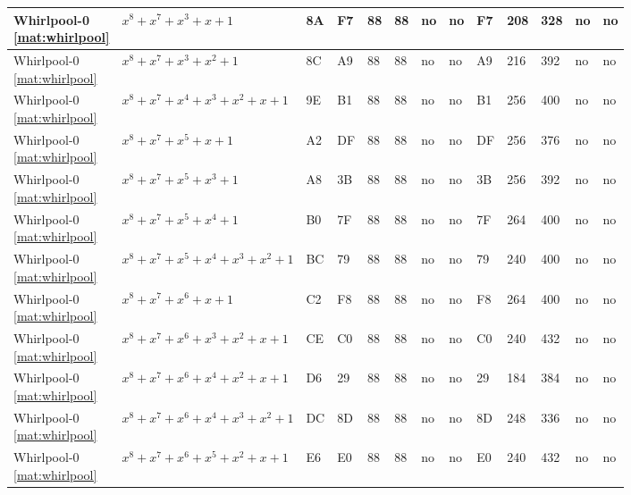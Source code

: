 \begin{tiny}
\begin{longtable}{|l|l|l|l|l|l|l|l|l|l|l|l|l|}
\shortstack{Whirlpool-0 \\ \eqref{mat:whirlpool}} & $x^8 + x^7 + x^3 + x + 1$ & 8A & F7 & 88 & 88 & no & no & F7 & 208 & 328 & no & no \\ \hline
\shortstack{Whirlpool-0 \\ \eqref{mat:whirlpool}} & $x^8 + x^7 + x^3 + x^2 + 1$ & 8C & A9 & 88 & 88 & no & no & A9 & 216 & 392 & no & no \\ \hline
\shortstack{Whirlpool-0 \\ \eqref{mat:whirlpool}} & $x^8 + x^7 + x^4 + x^3 + x^2 + x + 1$ & 9E & B1 & 88 & 88 & no & no & B1 & 256 & 400 & no & no \\ \hline
\shortstack{Whirlpool-0 \\ \eqref{mat:whirlpool}} & $x^8 + x^7 + x^5 + x + 1$ & A2 & DF & 88 & 88 & no & no & DF & 256 & 376 & no & no \\ \hline
\shortstack{Whirlpool-0 \\ \eqref{mat:whirlpool}} & $x^8 + x^7 + x^5 + x^3 + 1$ & A8 & 3B & 88 & 88 & no & no & 3B & 256 & 392 & no & no \\ \hline
\shortstack{Whirlpool-0 \\ \eqref{mat:whirlpool}} & $x^8 + x^7 + x^5 + x^4 + 1$ & B0 & 7F & 88 & 88 & no & no & 7F & 264 & 400 & no & no \\ \hline
\shortstack{Whirlpool-0 \\ \eqref{mat:whirlpool}} & $x^8 + x^7 + x^5 + x^4 + x^3 + x^2 + 1$ & BC & 79 & 88 & 88 & no & no & 79 & 240 & 400 & no & no \\ \hline
\shortstack{Whirlpool-0 \\ \eqref{mat:whirlpool}} & $x^8 + x^7 + x^6 + x + 1$ & C2 & F8 & 88 & 88 & no & no & F8 & 264 & 400 & no & no \\ \hline
\shortstack{Whirlpool-0 \\ \eqref{mat:whirlpool}} & $x^8 + x^7 + x^6 + x^3 + x^2 + x + 1$ & CE & C0 & 88 & 88 & no & no & C0 & 240 & 432 & no & no \\ \hline
\shortstack{Whirlpool-0 \\ \eqref{mat:whirlpool}} & $x^8 + x^7 + x^6 + x^4 + x^2 + x + 1$ & D6 & 29 & 88 & 88 & no & no & 29 & 184 & 384 & no & no \\ \hline
\shortstack{Whirlpool-0 \\ \eqref{mat:whirlpool}} & $x^8 + x^7 + x^6 + x^4 + x^3 + x^2 + 1$ & DC & 8D & 88 & 88 & no & no & 8D & 248 & 336 & no & no \\ \hline
\shortstack{Whirlpool-0 \\ \eqref{mat:whirlpool}} & $x^8 + x^7 + x^6 + x^5 + x^2 + x + 1$ & E6 & E0 & 88 & 88 & no & no & E0 & 240 & 432 & no & no \\ \hline

\end{longtable}
\end{tiny}
